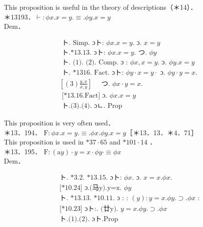 \documentclass[10pt]{article}
\begin{document}
This proposition is useful in the theory of descriptions（＊14）．\\
＊13193．$\vdash: \phi x . x=y . \equiv . \phi y . x=y$\\
Dem．


\begin{align*}
& \text { ト. Simp. ɔト: } \phi x . x=y . \text { ɔ. } x=y  \tag{1}\\
& \text { ト.*13.13. ɔト: } \phi x . x=y . \text { つ. } \phi y  \tag{2}\\
& \text { ト. (1). (2). Comp. ɔ : } \phi x, x=y . \text { ɔ. } \phi y . x=y  \tag{3}\\
& \text { ト. *1316. Fact. ɔト: } \phi y \cdot x=y \cdot \text { ɔ. } \phi y \cdot y=x \text {. } \\
& {\left[(3) \frac{y, x}{x, y}\right] \quad \text { つ. } \phi x \cdot y=x \text {. }} \\
& \text { [*13.16.Fact] ɔ. } \phi x . x=y  \tag{4}\\
& \text { ト.(3).(4). ɔㄴ. Prop }
\end{align*}


This proposition is very often used．\\
＊13．194． $\mathrm{F}: \phi x . x=y . \equiv . \phi x . \phi y . x=y$［＊13．13．＊4．71］\\
This proposition is used in $* 37 \cdot 65$ and $* 101 \cdot 14$ ．\\
＊13．195． $\mathrm{F}:(\mathrm{a} y) \cdot y=x \cdot \phi y \cdot \equiv \phi x$\\
Dem．


\begin{align*}
& \text { ト. *3.2. *13.15. ɔト: } \phi x . \text { ɔ. } x=x . \phi x \text {. } \\
& \text { [*10.24] ɔ.(马y).y=x. } \phi y  \tag{1}\\
& \text { ト. *13.13. *10.11. ɔ : : }(y): y=x . \phi y . \supset . \phi x \text { : } \\
& \text { [*10.23] ɔト:. (廿y). } y=x . \phi y . \supset . \phi x  \tag{2}\\
& \text { ト.(1).(2). ɔト.Prop }
\end{align*}
\end{document}
